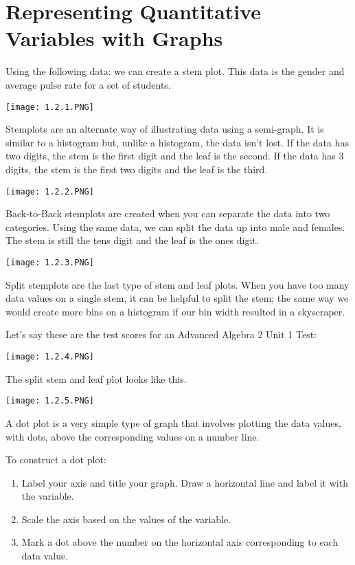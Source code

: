\documentclass[../stats.tex]{subfiles}
\begin{document}
\section{Representing Quantitative Variables with Graphs}
Using the following data: we can create a stem plot. This data is the gender and average pulse rate for a set of students.
\begin{center}
    \texttt{[image: 1.2.1.PNG]}
\end{center}
Stemplots are an alternate way of illustrating data using a semi-graph. It is similar to a histogram but, unlike a histogram, the data isn't lost. If the data has two digits, the stem is the first digit and the leaf is the second. If the data has 3 digits, the stem is the first two digits and the leaf is the third.
\begin{center}
    \texttt{[image: 1.2.2.PNG]}
\end{center}

Back-to-Back stemplots are created when you can separate the data into two categories. Using the same data, we can split the data up into male and females. The stem is still the tens digit and the leaf is the ones digit.
\begin{center}
    \texttt{[image: 1.2.3.PNG]}
\end{center}

Split stemplots are the last type of stem and leaf plots. When you have too many data values on a single stem, it can be helpful to split the stem; the same way we would create more bins on a histogram if our bin width resulted in a skyscraper.

Let's say these are the test scores for an Advanced Algebra 2 Unit 1 Test:
\begin{center}
    \texttt{[image: 1.2.4.PNG]}
\end{center}
The split stem and leaf plot looks like this.
\begin{center}
    \texttt{[image: 1.2.5.PNG]}
\end{center}

A dot plot is a very simple type of graph that involves plotting the data values, with dots, above the corresponding values on a number line. 

To construct a dot plot:
\begin{enumerate}
    \item Label your axis and title your graph. Draw a horizontal line and label it with the variable.
    \item Scale the axis based on the values of the variable.
    \item Mark a dot above the number on the horizontal axis corresponding to each data value.
\end{enumerate}
\end{document}
